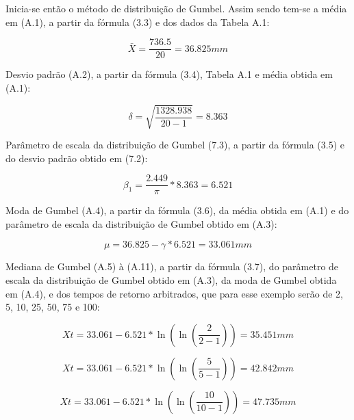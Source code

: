 Inicia-se então o método de distribuição de Gumbel. Assim sendo tem-se a média em (A.1), a partir da fórmula (3.3) e dos dados da Tabela A.1:\bigskip

\begin{equation}
\bar{X} = \frac{736.5}{20} = 36.825 mm
\end{equation}\bigskip

\newpage
 
Desvio padrão (A.2), a partir da fórmula (3.4), Tabela A.1 e média obtida em (A.1):\bigskip

\begin{equation}
\delta = \sqrt{\frac{1328.938}{20 - 1}} = 8.363
\end{equation}\bigskip

Parâmetro de escala da distribuição de Gumbel (7.3), a partir da fórmula (3.5) e do desvio padrão obtido em (7.2):\bigskip

\begin{equation}
\beta_1 = \frac{2.449}{\pi} * 8.363 = 6.521
\end{equation}\bigskip

Moda de Gumbel (A.4), a partir da fórmula (3.6), da média obtida em (A.1) e do parâmetro de escala da distribuição de Gumbel obtido em (A.3):\bigskip

\begin{equation}
\mu = 36.825 - \gamma * 6.521 = 33.061 mm
\end{equation}\bigskip

Mediana de Gumbel (A.5) à (A.11), a partir da fórmula (3.7), do parâmetro de escala da distribuição de Gumbel obtido em (A.3), da moda de Gumbel obtida em (A.4), e dos tempos de retorno arbitrados, que para esse exemplo serão de 2, 5, 10, 25, 50, 75 e 100:\bigskip

\begin{equation}
Xt = 33.061 - 6.521 * \ln{\left(\ln{\left(\frac{2}{2 - 1}\right)}\right)} = 35.451 mm
\end{equation}

\begin{equation}
Xt = 33.061 - 6.521 * \ln{\left(\ln{\left(\frac{5}{5 - 1}\right)}\right)} = 42.842 mm
\end{equation}

\begin{equation}
Xt = 33.061 - 6.521 * \ln{\left(\ln{\left(\frac{10}{10 - 1}\right)}\right)} = 47.735 mm
\end{equation}

